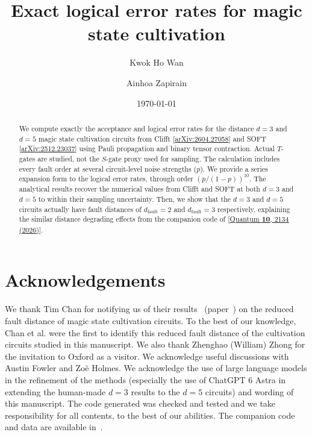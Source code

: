 \documentclass[a4paper,twocolumn,11pt,unpublished,allowtoday]{quantumarticle}
\title{Exact logical error rates for magic state cultivation}
\author{Kwok Ho Wan}
\affiliation{Blackett Laboratory, Imperial College London, South Kensington, London SW7 2AZ, UK}
\affiliation{Mathematical Institute, University of Oxford, Andrew Wiles Building, Woodstock Road, Oxford OX2 6GG, UK}
\author{Ainhoa Zapirain}
\date{\today}
\newcommand{\arxiv}[1]{[\href{https://arxiv.org/abs/#1}{arXiv:#1}]}
\begin{document}
\maketitle
\begin{abstract}
We compute exactly the acceptance and logical error rates for the distance $d=3$ and $d=5$ magic state cultivation circuits from Clifft \arxiv{2604.27058} and 
SOFT \arxiv{2512.23037} using Pauli propagation and binary tensor contraction. Actual $T$-gates are studied, not the $S$-gate proxy used for sampling. The calculation includes every fault order at several circuit-level noise strengths ($p$). 
We provide a series expansion form to the logical error rates, through order $(p/(1-p))^{10}$. 
The analytical results recover the numerical values from Clifft and SOFT at both $d=3$ and $d=5$ to within their sampling uncertainty. Then, we show that the $d=3$ and $d=5$ circuits actually have fault distances of $d_{\text{fault}}=2$ and $d_{\text{fault}}=3$ respectively, explaining the similar distance degrading effects from the companion code of [\href{https://doi.org/10.22331/q-2026-06-12-2134}{Quantum \textbf{10}, 2134 (2026)}].
\end{abstract}



\section{Acknowledgements}
We thank Tim Chan for notifying us of their results~\cite{chan_msc} (paper~\cite{chan2026diagnosingrestoringdegradedfault}) on the reduced fault distance of magic state cultivation circuits. To the best of our knowledge, Chan et al. were the first to identify this reduced fault distance of the cultivation circuits studied in this manuscript. 
We also thank Zhenghao (William) Zhong for the invitation to Oxford as a visitor.
We acknowledge useful discussions with Austin Fowler and Zoë Holmes.
We acknowledge the use of large language models in the refinement of the methods (especially the use of ChatGPT 6 Astra in extending the human-made $d=3$ results to the $d=5$ circuits) and wording of this manuscript. The code generated was checked and tested and we take responsibility for all contents, to the best of our abilities.
The companion code and data are available in~\cite{exact_msc_code}.
\FloatBarrier


\appendix

\clearpage

\clearpage
\onecolumn

\clearpage

\clearpage

\clearpage

\clearpage
\twocolumn

\clearpage
\onecolumn

\clearpage

\clearpage

\end{document}

